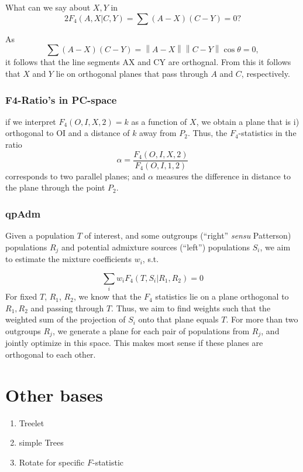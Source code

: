 \documentclass[9pt,twocolumn,twoside,lineno]{pnas-new}
\newcommand{\norm}[1]{\left\lVert #1 \right\rVert}
\begin{document}
What can we say about $X, Y$ in
\begin{equation}
    2 F_4(A, X | C, Y) = \sum (A-X)(C-Y) = 0
    \text{?}
\end{equation}

As $$\sum(A-X)(C-Y) = \norm{A-X}\norm{C-Y}\cos{\theta} = 0,$$
it follows that the line segments AX and CY are orthognal. From this it follows that $X$ and $Y$ lie on orthogonal planes that pass through $A$ and $C$, respectively.




\subsubsection{F4-Ratio's in PC-space}
if we interpret $F_4(O,I,X,2)=k$ as a function of $X$, we obtain a plane that is i) orthogonal to OI and a distance of $k$ away from $P_2$. Thus, the $F_4$-statistics in the ratio
\begin{equation}
    \alpha = \frac{F_4(O,I,X,2)} {F_4(O,I,1,2)}
\end{equation}
corresponds to two parallel planes; and $\alpha$ measures the difference in distance to the plane through the point $P_2$.


\subsubsection{qpAdm}
Given a population $T$ of interest, and some outgroups (``right'' \textit{sensu} Patterson) populations $R_j$ and potential admixture sources (``left'') populations $S_i$, we aim to estimate the mixture coefficients $w_i$, s.t.

\begin{equation}
    \sum_i w_i F_4(T, S_i | R_1, R_2) = 0
\end{equation}
For fixed $T$, $R_1$, $R_2$, we know that the $F_4$ statistics lie on a plane orthogonal to $R_1, R_2$ and passing through $T$. Thus, we aim to find weights such that the weighted sum of the projection of $S_i$ onto that plane equals $T$. For more than two outgroups $R_j$, we generate a plane for each pair of populations from $R_j$, and jointly optimize in this space. This makes most sense if these planes are orthogonal to each other.



\section{Other bases}
\begin{enumerate}
    \item Treelet
    \item simple Trees
    \item Rotate for specific $F$-statistic
\end{enumerate}
\end{document}
